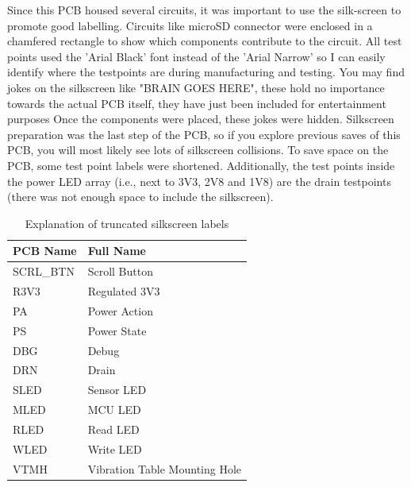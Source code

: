 Since this PCB housed several circuits, it was important to use the silk-screen to promote good labelling. Circuits like microSD connector were enclosed in a chamfered rectangle to show which components contribute to the circuit. All test points used the 'Arial Black' font instead of the 'Arial Narrow' so I can easily identify where the testpoints are during manufacturing and testing. You may find jokes on the silkscreen like "BRAIN GOES HERE", these hold no importance towards the actual PCB itself, they have just been included for entertainment purposes
Once the components were placed, these jokes were hidden. Silkscreen preparation was the last step of the PCB, so if you explore previous saves of this PCB, you will most likely see lots of silkscreen collisions.
\nl
To save space on the PCB, some test point labels were shortened. Additionally, the test points inside the power LED array (i.e., next to 3V3, 2V8 and 1V8) are the drain testpoints (there was not enough space to include the silkscreen).

\begin{table}
    \centering
    \begin{tabular}{|l|l|}
        \hline
        \textbf{PCB Name} & \textbf{Full Name} \\
        \hline
        SCRL\_BTN & Scroll Button \\ \hline
        R3V3 & Regulated 3V3 \\ \hline
        PA & Power Action \\ \hline
        PS & Power State \\ \hline
        DBG & Debug \\ \hline
        DRN & Drain \\ \hline
        SLED & Sensor LED \\ \hline
        MLED & MCU LED \\ \hline
        RLED & Read LED \\ \hline
        WLED & Write LED \\ \hline
        VTMH & Vibration Table Mounting Hole \\ \hline
    \end{tabular}
    \caption{Explanation of truncated silkscreen labels}
\end{table}